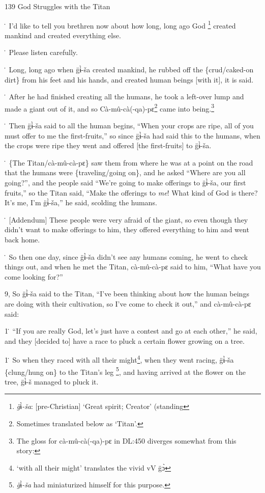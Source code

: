 
139 God Struggles with the Titan

\. I'd like to tell you brethren now about how long, long ago God \footnote{\textit{g̈}ɨ̀\textit{-ša}: [pre-Christian] `Great spirit; Creator' (standing} created mankind
and created everything else.

\. Please listen carefully.

\. Long, long ago when g̈ɨ̀-ša created mankind, he rubbed off the \{crud/caked-on
dirt\} from his  feet and his hands, and created human beings [with it], it is
said.

\. After he had finished creating all the humans, he took a left-over lump and
made a giant out of it, and so Cà-mû-cà(-qa)-pɛ\footnote{Sometimes translated below as `Titan'.} came into being.\footnote{The gloss for cà-mû-cà(-qa)-pɛ in DL:450 diverges somewhat from this story:}

\. Then g̈ɨ̀-ša said to all the human begins, ``When your crops are ripe, all
of you must offer to me the first-fruits,'' so since g̈ɨ̀-ša had said this
to the humans, when the crops were ripe they went and offered [the first-fruits]
to g̈ɨ̀-ša.

\. \{The Titan/cà-mû-cà-pɛ\} saw them from where he was at a point on the road
that the humans were \{traveling/going on\}, and he asked ``Where are you all going?'',
and the people said ``We're going to make offerings to g̈ɨ̀-ša, our first fruits,''
so the Titan said, ``Make the offerings to \textit{me}! What kind of God is there?
It's me, I'm g̈ɨ̀-ša,'' he said, scolding the humans.

\. [Addendum] These people were very afraid of the giant, so even though they didn't
want to make offerings to him, they offered everything to him and went back home.

\. So then one day, since g̈ɨ̀-ša didn't see any humans coming, he went to
check things out, and when he met the Titan, cà-mû-cà-pɛ said to him, ``What
have you come looking for?''

9, So g̈ɨ̀-ša said to the Titan, ``I've been thinking about how the human beings
are doing with their cultivation, so I've come to check it out,'' and cà-mû-cà-pɛ
said:

1\. ``If you are really God, let's just have a contest and go at each other,''
he said, and they [decided to] have a race to pluck a certain flower growing on
a tree.

1\. So when they raced with all their might\footnote{`with all their might' translates the vivid vV g̈ɔ̀}, when they went racing, g̈ɨ̀-ša
\{clung/hung on\} to the Titan's leg \footnote{\textit{g̈}ɨ̀\textit{-ša }had miniaturized himself for this purpose.}, and having arrived at the flower on the
tree, g̈ɨ̀-š managed to pluck it.

